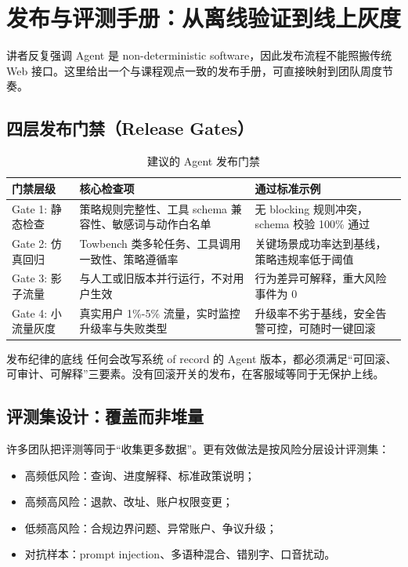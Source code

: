\section{发布与评测手册：从离线验证到线上灰度}

讲者反复强调 Agent 是 non-deterministic software，因此发布流程不能照搬传统 Web 接口。这里给出一个与课程观点一致的发布手册，可直接映射到团队周度节奏。

\subsection{四层发布门禁（Release Gates）}

\begin{table}[H]
\centering
\caption{建议的 Agent 发布门禁}
\begin{tabularx}{\textwidth}{>{\raggedright\arraybackslash}p{2.2cm} >{\raggedright\arraybackslash}p{3.6cm} >{\raggedright\arraybackslash}X}
\toprule
门禁层级 & 核心检查项 & 通过标准示例 \\
\midrule
Gate 1: 静态检查 & 策略规则完整性、工具 schema 兼容性、敏感词与动作白名单 & 无 blocking 规则冲突，schema 校验 100\% 通过 \\
Gate 2: 仿真回归 & Towbench 类多轮任务、工具调用一致性、策略遵循率 & 关键场景成功率达到基线，策略违规率低于阈值 \\
Gate 3: 影子流量 & 与人工或旧版本并行运行，不对用户生效 & 行为差异可解释，重大风险事件为 0 \\
Gate 4: 小流量灰度 & 真实用户 1\%-5\% 流量，实时监控升级率与失败类型 & 升级率不劣于基线，安全告警可控，可随时一键回滚 \\
\bottomrule
\end{tabularx}
\end{table}

\begin{importantbox}{发布纪律的底线}
任何会改写系统 of record 的 Agent 版本，都必须满足“可回滚、可审计、可解释”三要素。没有回滚开关的发布，在客服域等同于无保护上线。
\end{importantbox}

\subsection{评测集设计：覆盖而非堆量}

许多团队把评测等同于“收集更多数据”。更有效做法是按风险分层设计评测集：
\begin{itemize}[leftmargin=1.5em]
    \item 高频低风险：查询、进度解释、标准政策说明；
    \item 高频高风险：退款、改址、账户权限变更；
    \item 低频高风险：合规边界问题、异常账户、争议升级；
    \item 对抗样本：prompt injection、多语种混合、错别字、口音扰动。
\end{itemize}

